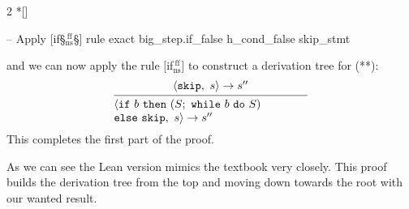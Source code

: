 \begin{paracol}{2}
\switchcolumn[1]*[]
\begin{leftcolumn}
    \begin{Lean_Code}
    -- Apply [if§\color{green!40!black}$_{\text{ns}}^{\ \text{ff}}$§] rule
    exact big_step.if_false
      h_cond_false
      skip_stmt
    \end{Lean_Code}
\end{leftcolumn}

\switchcolumn
\begin{rightcolumn} \noindent
and we can now apply the rule [if$_{\text{ns}}^{\ \text{ff}}$] to construct a derivation tree for (**):
\[
    \begin{prooftree}
        \hypo{\langle \mathtt{skip},\ s\rangle \to s''}
        \infer[
        ]1{
            \parbox{6cm}{$
        \langle \mathtt{if}\ b\ \mathtt{then}\ (S;\ \mathtt{while}\ b\ \mathtt{do}\ S) \\ \mathtt{else}\ \mathtt{skip},\ s\rangle \to s''
            $}
        }
    \end{prooftree}
\]
This completes the first part of the proof.
\end{rightcolumn}
\end{paracol}
\vspace{1em}

As we can see the Lean version mimics the textbook very closely.
This proof builds the derivation tree from the top and moving down towards the
root with our wanted result.


